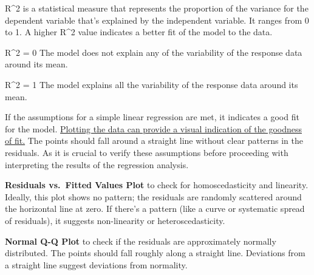 \documentclass[
  a4paper,
  DIV=11,
  numbers=noendperiod]{scrartcl}
\begin{document}
R\^{}2 is a statistical measure that represents the proportion of the
variance for the dependent variable that's explained by the independent
variable. It ranges from 0 to 1. A higher R\^{}2 value indicates a
better fit of the model to the data.

R\^{}2 = 0 The model does not explain any of the variability of the
response data around its mean.

R\^{}2 = 1 The model explains all the variability of the response data
around its mean.

If the assumptions for a simple linear regression are met, it indicates
a good fit for the model. \ul{Plotting the data can provide a visual
indication of the goodness of fit.} The points should fall around a
straight line without clear patterns in the residuals. As it is crucial
to verify these assumptions before proceeding with interpreting the
results of the regression analysis.

\textbf{Residuals vs.~Fitted Values Plot} to check for homoscedasticity
and linearity. Ideally, this plot shows no pattern; the residuals are
randomly scattered around the horizontal line at zero. If there's a
pattern (like a curve or systematic spread of residuals), it suggests
non-linearity or heteroscedasticity.

\textbf{Normal Q-Q Plot} to check if the residuals are approximately
normally distributed. The points should fall roughly along a straight
line. Deviations from a straight line suggest deviations from normality.

 
  \providecommand{\huxb}[2]{\arrayrulecolor[RGB]{#1}\global\arrayrulewidth=#2pt}
  \providecommand{\huxvb}[2]{\color[RGB]{#1}\vrule width #2pt}
  \providecommand{\huxtpad}[1]{\rule{0pt}{#1}}
  \providecommand{\huxbpad}[1]{\rule[-#1]{0pt}{#1}}
\end{document}
